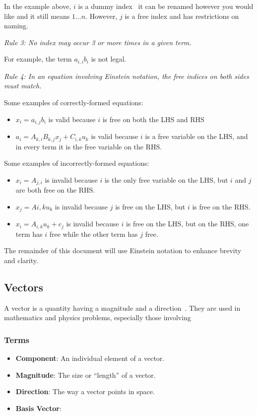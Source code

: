 \documentclass[12pt]{article}
\begin{document}
\noindent In the example above, $i$ is a dummy index \textemdash~it can be renamed
however you would like and it still means $1\ldots n$. However, $j$ is a free index
and has restrictions on naming.

\medskip
\noindent\textit{Rule 3: No index may occur 3 or more times in a given term.}

\noindent For example, the term $a_{i,i}b_i$ is not legal.

\medskip
\noindent\textit{Rule 4: In an equation involving Einstein notation, the free indices
on both sides must match.}

\noindent Some examples of correctly-formed equations:

\begin{itemize}
\item $x_i = a_{i,j}b_i$ is valid because $i$ is free on both the LHS and RHS
\item $a_i = A_{k,i}B_{k,j}x_j + C_{i,k}u_k$ is valid because $i$ is a free variable on
      the LHS, and in every term it is the free variable on the RHS.
\end{itemize}

\noindent Some examples of incorrectly-formed equations:

\begin{itemize}
  \item $x_i = A_{j,i}$ is invalid because $i$ is the only free variable on the LHS, but
      $i$ and $j$ are both free on the RHS.
  \item $x_j = A{i,k}u_k$ is invalid because $j$ is free on the LHS, but $i$ is free on 
      the RHS.
  \item $x_i = A_{i,k}u_k + c_j$ is invalid because $i$ is free on the LHS, but on the 
      RHS, one term has $i$ free while the other term has $j$ free.
  \end{itemize}

The remainder of this document will use Einstein notation to enhance brevity and clarity.

\subsection{Vectors}
A vector is a quantity having a magnitude and a direction~\cite{Wikipedia_Vectors_2024}.
They are used in mathematics and physics problems, especially those involving 

\subsubsection{Terms}
\begin{itemize}
\item \textbf{Component}: An individual element of a vector.
\item \textbf{Magnitude}: The size or ``length'' of a vector.
\item \textbf{Direction}: The way a vector points in space.
\item \textbf{Basis Vector}: 
\end{itemize}
\end{document}
